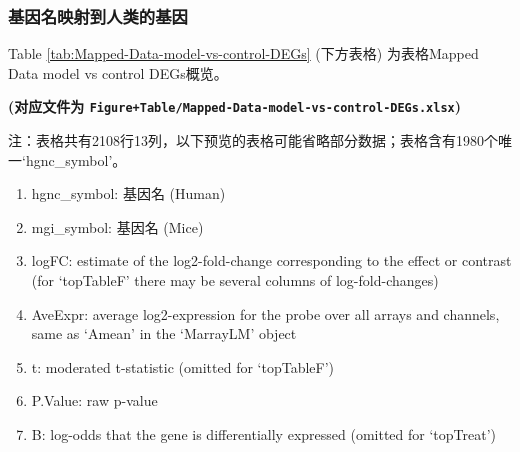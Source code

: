 \documentclass[
]{article}
\providecommand{\tightlist}{%
  \setlength{\itemsep}{0pt}\setlength{\parskip}{0pt}}
\begin{document}
\hypertarget{ux57faux56e0ux540dux6620ux5c04ux5230ux4ebaux7c7bux7684ux57faux56e0}{%
\subsubsection{基因名映射到人类的基因}\label{ux57faux56e0ux540dux6620ux5c04ux5230ux4ebaux7c7bux7684ux57faux56e0}}

Table \ref{tab:Mapped-Data-model-vs-control-DEGs} (下方表格) 为表格Mapped Data model vs control DEGs概览。

\textbf{(对应文件为 \texttt{Figure+Table/Mapped-Data-model-vs-control-DEGs.xlsx})}

\begin{center}\begin{tcolorbox}[colback=gray!10, colframe=gray!50, width=0.9\linewidth, arc=1mm, boxrule=0.5pt]注：表格共有2108行13列，以下预览的表格可能省略部分数据；表格含有1980个唯一`hgnc\_symbol'。
\end{tcolorbox}
\end{center}
\begin{center}\begin{tcolorbox}[colback=gray!10, colframe=gray!50, width=0.9\linewidth, arc=1mm, boxrule=0.5pt]\begin{enumerate}\tightlist
\item hgnc\_symbol:  基因名 (Human)
\item mgi\_symbol:  基因名 (Mice)
\item logFC:  estimate of the log2-fold-change corresponding to the effect or contrast (for ‘topTableF’ there may be several columns of log-fold-changes)
\item AveExpr:  average log2-expression for the probe over all arrays and channels, same as ‘Amean’ in the ‘MarrayLM’ object
\item t:  moderated t-statistic (omitted for ‘topTableF’)
\item P.Value:  raw p-value
\item B:  log-odds that the gene is differentially expressed (omitted for ‘topTreat’)
\end{enumerate}\end{tcolorbox}
\end{center}
\end{document}
